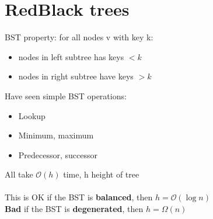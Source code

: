 \documentclass{article}[18pt]
\begin{document}
\section{RedBlack trees}
BST property: for all nodes v with key k:
\begin{itemize}
	\item nodes in left subtree has keys $<k$
	\item nodes in right subtree have keys $>k$
\end{itemize}
Have seen simple BST operations:
\begin{itemize}
	\item Lookup
	\item Minimum, maximum
	\item Predecessor, successor
\end{itemize}
All take $\mathcal{O}(h)$ time, h height of tree\\
\\
This is OK if the BST is \textbf{balanced}, then $h=\mathcal{O}(\log n)$\\
\textbf{Bad} if the BST is \textbf{degenerated}, then $h=\Omega(n)$
\end{document}
